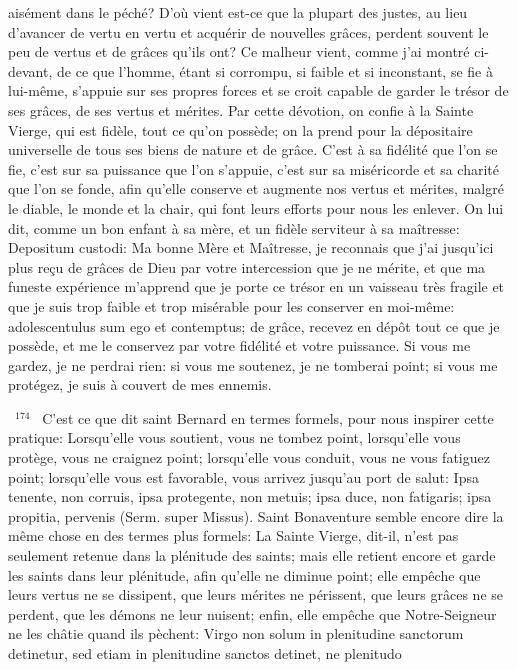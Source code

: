 \documentclass[paper=a5,pagesize=pdftex,fontsize=15pt,headinclude=on,twoside=off]{scrbook}
\newcommand{\negphantom}[1]{\settowidth{\dimen0}{#1}\hspace*{-\dimen0}}
\newcommand{\versenb}[1]{\par \vspace{10pt}~\negphantom{~${}^{#1}$~}${}^{#1}$~}
\begin{document}
aisément dans le péché? D'où vient est-ce que la plupart des justes, au lieu d'avancer de vertu en vertu et acquérir
de nouvelles grâces, perdent souvent le peu de vertus et de grâces qu'ils ont? Ce malheur vient, comme j'ai
montré ci-devant, de ce que l'homme, étant si corrompu, si faible et si inconstant, se fie à lui-même, s'appuie sur
ses propres forces et se croit capable de garder le trésor de ses grâces, de ses vertus et mérites. Par cette
dévotion, on confie à la Sainte Vierge, qui est fidèle, tout ce qu'on possède; on la prend pour la dépositaire
universelle de tous ses biens de nature et de grâce. C'est à sa fidélité que l'on se fie, c'est sur sa puissance que
l'on s'appuie, c'est sur sa miséricorde et sa charité que l'on se fonde, afin qu'elle conserve et augmente nos vertus
et mérites, malgré le diable, le monde et la chair, qui font leurs efforts pour nous les enlever. On lui dit, comme un
bon enfant à sa mère, et un fidèle serviteur à sa maîtresse: Depositum custodi: Ma bonne Mère et Maîtresse, je
reconnais que j'ai jusqu'ici plus reçu de grâces de Dieu par votre intercession que je ne mérite, et que ma funeste
expérience m'apprend que je porte ce trésor en un vaisseau très fragile et que je suis trop faible et trop misérable
pour les conserver en moi-même: adolescentulus sum ego et contemptus; de grâce, recevez en dépôt tout ce que
je possède, et me le conservez par votre fidélité et votre puissance. Si vous me gardez, je ne perdrai rien: si vous
me soutenez, je ne tomberai point; si vous me protégez, je suis à couvert de mes ennemis.
\versenb{174} C'est ce que dit saint Bernard en termes formels, pour nous inspirer cette pratique: Lorsqu'elle vous soutient,
vous ne tombez point, lorsqu'elle vous protège, vous ne craignez point; lorsqu'elle vous conduit, vous ne vous
fatiguez point; lorsqu'elle vous est favorable, vous arrivez jusqu'au port de salut: Ipsa tenente, non corruis, ipsa
protegente, non metuis; ipsa duce, non fatigaris; ipsa propitia, pervenis (Serm. super Missus). Saint Bonaventure
semble encore dire la même chose en des termes plus formels: La Sainte Vierge, dit-il, n'est pas seulement
retenue dans la plénitude des saints; mais elle retient encore et garde les saints dans leur plénitude, afin qu'elle ne
diminue point; elle empêche que leurs vertus ne se dissipent, que leurs mérites ne périssent, que leurs grâces ne
se perdent, que les démons ne leur nuisent; enfin, elle empêche que Notre-Seigneur ne les châtie quand ils
pèchent: Virgo non solum in plenitudine sanctorum detinetur, sed etiam in plenitudine sanctos detinet, ne plenitudo
\end{document}
